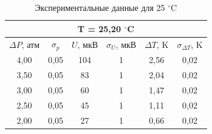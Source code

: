 \documentclass[a4paper, 12pt]{article}
\begin{document}
    \begin{table}[H]
	\centering
	\begin{tabular}{|cccccc|}
            \hline
            \multicolumn{6}{|c|}{T = 25,20 $^\circ$C} \\ \hline
            \multicolumn{1}{|c|}{$\Delta P$, атм} & \multicolumn{1}{c|}{$\sigma_p$} & \multicolumn{1}{c|}{$U$, мкВ} & \multicolumn{1}{c|}{$\sigma_U$, мкВ} & \multicolumn{1}{c|}{$\Delta T$, K} & $\sigma_{\Delta T}$, K \\ \hline
            \multicolumn{1}{|c|}{4,00} & \multicolumn{1}{c|}{0,05} & \multicolumn{1}{c|}{104} & \multicolumn{1}{c|}{1} & \multicolumn{1}{c|}{2,56} & 0,02 \\ \hline
            \multicolumn{1}{|c|}{3,50} & \multicolumn{1}{c|}{0,05} & \multicolumn{1}{c|}{83} & \multicolumn{1}{c|}{1} & \multicolumn{1}{c|}{2,04} & 0,02 \\ \hline
            \multicolumn{1}{|c|}{3,00} & \multicolumn{1}{c|}{0,05} & \multicolumn{1}{c|}{60} & \multicolumn{1}{c|}{1} & \multicolumn{1}{c|}{1,47} & 0,02 \\ \hline
            \multicolumn{1}{|c|}{2,50} & \multicolumn{1}{c|}{0,05} & \multicolumn{1}{c|}{45} & \multicolumn{1}{c|}{1} & \multicolumn{1}{c|}{1,11} & 0,02 \\ \hline
            \multicolumn{1}{|c|}{2,00} & \multicolumn{1}{c|}{0,05} & \multicolumn{1}{c|}{27} & \multicolumn{1}{c|}{1} & \multicolumn{1}{c|}{0,66} & 0,02 \\ \hline
        \end{tabular}
	\caption{Экспериментальные данные для 25 $^\circ$C}
	\label{tab:25C}
    \end{table}
\end{document}
